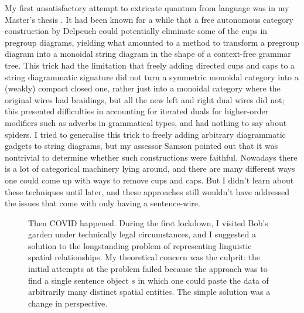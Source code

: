 My first unsatisfactory attempt to extricate quantum from language was in my Master's thesis \citep{wangGraphicalGrammarGraphical2019}. It had been known for a while that a free autonomous category construction by Delpeuch \citep{delpeuchAutonomizationMonoidalCategories2020a} could potentially eliminate some of the cups in pregroup diagrams, yielding what amounted to a method to transform a pregroup diagram into a monoidal string diagram in the shape of a context-free grammar tree. This trick had the limitation that freely adding directed cups and caps to a string diagrammatic signature did not turn a symmetric monoidal category into a (weakly) compact closed one, rather just into a monoidal category where the original wires had braidings, but all the new left and right dual wires did not; this presented difficulties in accounting for iterated duals for higher-order modifiers such as adverbs in grammatical types, and had nothing to say about spiders. I tried to generalise this trick to freely adding arbitrary diagrammatic gadgets to string diagrams, but my assessor Samson pointed out that it was nontrivial to determine whether such constructions were faithful. Nowadays there is a lot of categorical machinery lying around, and there are many different ways one could come up with ways to remove cups and caps. But I didn't learn about these techniques until later, and these approaches still wouldn't have addressed the issues that come with only having a sentence-wire.

\begin{figure}[h!]
\centering
{}
\caption{Then COVID happened. During the first lockdown, I visited Bob's garden under technically legal circumstances, and I suggested a solution to the longstanding problem of representing linguistic spatial relationships. My theoretical concern was the culprit: the initial attempts at the problem failed because the approach was to find a single sentence object $s$ in which one could paste the data of arbitrarily many distinct spatial entities. The simple solution was a change in perspective.}
\end{figure}

